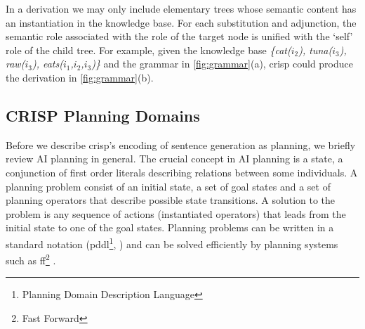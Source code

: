 In a derivation we may only include elementary trees whose semantic content has an instantiation in the knowledge base. For each substitution and adjunction, the semantic role associated with the role of the target node is unified with the `self' role of the child tree. For example, given the knowledge base 
{\it \{cat($i_2$), tuna($i_3$), raw($i_3$), eats($i_1$,$i_2$,$i_3$)\}} and the grammar in \ref{fig:grammar}(a), {\sc crisp} could produce the derivation in \ref{fig:grammar}(b).


\subsection{CRISP Planning Domains} 
\label{ssec:crispdomain}
Before we describe {\sc crisp}'s encoding of sentence generation as planning, we briefly review AI planning in general. 
The crucial concept in AI planning is a state, a conjunction of first order literals describing relations between some individuals. A planning problem consist of an initial state, a set of goal states and a set of planning operators that describe possible state transitions.  A solution to the problem is any sequence of actions (instantiated operators) that leads from the initial state to one of the goal states. Planning problems can be written in a standard notation ({\sc pddl}\footnote{Planning Domain Description Language}, ) and can be solved efficiently by planning systems such as {\sc ff}\footnote{Fast Forward} \cite{hoffmannnebel2001}.  
     
